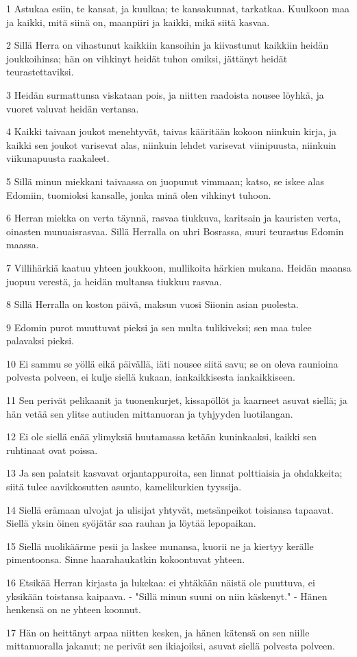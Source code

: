 \par 1 Astukaa esiin, te kansat, ja kuulkaa; te kansakunnat, tarkatkaa. Kuulkoon maa ja kaikki, mitä siinä on, maanpiiri ja kaikki, mikä siitä kasvaa.
\par 2 Sillä Herra on vihastunut kaikkiin kansoihin ja kiivastunut kaikkiin heidän joukkoihinsa; hän on vihkinyt heidät tuhon omiksi, jättänyt heidät teurastettaviksi.
\par 3 Heidän surmattunsa viskataan pois, ja niitten raadoista nousee löyhkä, ja vuoret valuvat heidän vertansa.
\par 4 Kaikki taivaan joukot menehtyvät, taivas kääritään kokoon niinkuin kirja, ja kaikki sen joukot varisevat alas, niinkuin lehdet varisevat viinipuusta, niinkuin viikunapuusta raakaleet.
\par 5 Sillä minun miekkani taivaassa on juopunut vimmaan; katso, se iskee alas Edomiin, tuomioksi kansalle, jonka minä olen vihkinyt tuhoon.
\par 6 Herran miekka on verta täynnä, rasvaa tiukkuva, karitsain ja kauristen verta, oinasten munuaisrasvaa. Sillä Herralla on uhri Bosrassa, suuri teurastus Edomin maassa.
\par 7 Villihärkiä kaatuu yhteen joukkoon, mullikoita härkien mukana. Heidän maansa juopuu verestä, ja heidän multansa tiukkuu rasvaa.
\par 8 Sillä Herralla on koston päivä, maksun vuosi Siionin asian puolesta.
\par 9 Edomin purot muuttuvat pieksi ja sen multa tulikiveksi; sen maa tulee palavaksi pieksi.
\par 10 Ei sammu se yöllä eikä päivällä, iäti nousee siitä savu; se on oleva raunioina polvesta polveen, ei kulje siellä kukaan, iankaikkisesta iankaikkiseen.
\par 11 Sen perivät pelikaanit ja tuonenkurjet, kissapöllöt ja kaarneet asuvat siellä; ja hän vetää sen ylitse autiuden mittanuoran ja tyhjyyden luotilangan.
\par 12 Ei ole siellä enää ylimyksiä huutamassa ketään kuninkaaksi, kaikki sen ruhtinaat ovat poissa.
\par 13 Ja sen palatsit kasvavat orjantappuroita, sen linnat polttiaisia ja ohdakkeita; siitä tulee aavikkosutten asunto, kamelikurkien tyyssija.
\par 14 Siellä erämaan ulvojat ja ulisijat yhtyvät, metsänpeikot toisiansa tapaavat. Siellä yksin öinen syöjätär saa rauhan ja löytää lepopaikan.
\par 15 Siellä nuolikäärme pesii ja laskee munansa, kuorii ne ja kiertyy kerälle pimentoonsa. Sinne haarahaukatkin kokoontuvat yhteen.
\par 16 Etsikää Herran kirjasta ja lukekaa: ei yhtäkään näistä ole puuttuva, ei yksikään toistansa kaipaava. - "Sillä minun suuni on niin käskenyt." - Hänen henkensä on ne yhteen koonnut.
\par 17 Hän on heittänyt arpaa niitten kesken, ja hänen kätensä on sen niille mittanuoralla jakanut; ne perivät sen ikiajoiksi, asuvat siellä polvesta polveen.

